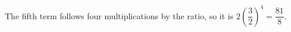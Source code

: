 The fifth term follows four multiplications by the ratio, so it is $2(\dfrac{3}{2})^4=\boxed{\dfrac{81}{8}}$.
